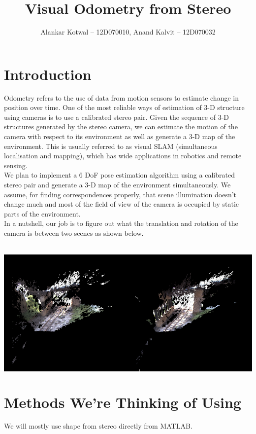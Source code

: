 \documentclass[11pt]{report}
\title{Visual Odometry from Stereo}
\author{Alankar Kotwal -- 12D070010, Anand Kalvit -- 12D070032}
\begin{document}
\maketitle
\newpage

\section*{Introduction}
Odometry refers to the use of data from motion sensors to estimate change in position over time. One of the most reliable ways of estimation of 3-D structure using cameras is to use a calibrated stereo pair. Given the sequence of 3-D structures generated by the stereo camera, we can estimate the motion of the camera with respect to its environment as well as generate a 3-D map of the environment. This is usually referred to as visual SLAM (simultaneous localisation and mapping), which has wide applications in robotics and remote sensing. \\

\noindent We plan to implement a 6 DoF pose estimation algorithm using a calibrated stereo pair and generate a 3-D map of the environment simultaneously. We assume, for finding correspondences properly, that scene illumination doesn't change much and most of the field of view of the camera is occupied by static parts of the environment. \\

\noindent In a nutshell, our job is to figure out what the translation and rotation of the camera is between two scenes as shown below. \\ \\
\centerline{\includegraphics[scale=0.50]{pointclouds}}
\newpage

\section*{Methods We're Thinking of Using}
We will mostly use shape from stereo directly from MATLAB. \\
\end{document}
